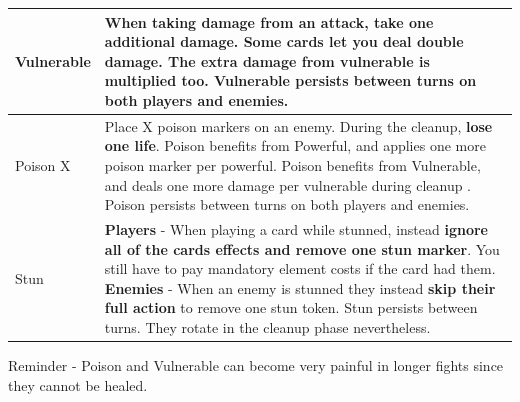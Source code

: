 \begin{longtable}{|p{2.5cm}|p{13.7cm}|}
	
	\hline
	Vulnerable \symVulnerable & When taking damage from an attack, \textbf{take one additional damage}. Some cards let you deal double damage. The extra damage from vulnerable is multiplied too. Vulnerable persists between turns on both players and enemies. \\
	\hline
	Poison X \symPoison & Place X poison markers on an enemy. During the cleanup, \textbf{lose one life}. Poison benefits from \symPowerful Powerful, and applies one more poison marker per powerful. Poison benefits from \symVulnerable Vulnerable, and deals one more damage per vulnerable during cleanup .  Poison persists between turns on both players and enemies. \\
	\hline
	Stun \symStun & \textbf{Players} - When playing a card while stunned, instead \textbf{ignore all of the cards effects and remove one stun marker}. You still have to pay mandatory element costs if the card had them. \hspace*{12cm} \linebreak \textbf{Enemies} - When an enemy is stunned they instead \textbf{skip their full action} to remove one stun token. Stun persists between turns. They rotate in the cleanup phase nevertheless.\\
	\hline
	
	
	
\end{longtable}


\begin{tcolorbox}[colframe=blue, colback=white]
	Reminder - Poison and Vulnerable can become very painful in longer fights since they cannot be healed. 
\end{tcolorbox}
